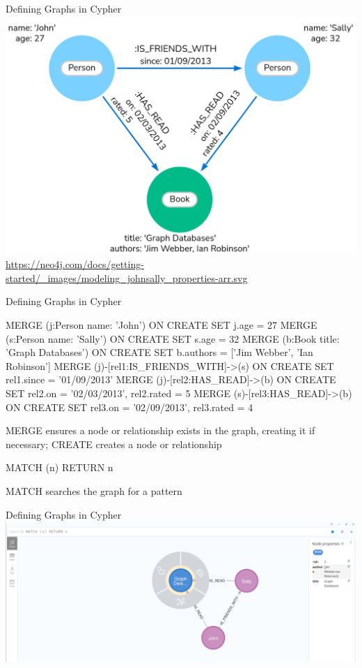 \documentclass[ignorenonframetext,xcolor=x11names]{beamer}
\begin{document}
\begin{frame}{Defining Graphs in Cypher}
\centering
\includegraphics[width=\textwidth]{screen4.png}
\tiny{\url{https://neo4j.com/docs/getting-started/_images/modeling_johnsally_properties-arr.svg}}
\end{frame}

\begin{frame}[fragile]{Defining Graphs in Cypher}

\scriptsize
\begin{cyphercode}
MERGE (j:Person {name: 'John'})
  ON CREATE SET j.age = 27
MERGE (s:Person {name: 'Sally'})
  ON CREATE SET s.age = 32
MERGE (b:Book {title: 'Graph Databases'})
  ON CREATE SET b.authors = ['Jim Webber', 'Ian Robinson']
MERGE (j)-[rel1:IS_FRIENDS_WITH]->(s)
  ON CREATE SET rel1.since = '01/09/2013'
MERGE (j)-[rel2:HAS_READ]->(b)
  ON CREATE SET rel2.on = '02/03/2013', rel2.rated = 5
MERGE (s)-[rel3:HAS_READ]->(b)
  ON CREATE SET rel3.on = '02/09/2013', rel3.rated = 4
\end{cyphercode}
\small
MERGE ensures a node or relationship exists in the graph, creating it if necessary; CREATE creates a node or relationship
\scriptsize
\begin{cyphercode}
MATCH (n) RETURN n
\end{cyphercode}
\small
MATCH searches the graph for a pattern
\end{frame}

\begin{frame}{Defining Graphs in Cypher}
\includegraphics[width=\textwidth]{screen2.png}
\end{frame}
\end{document}
